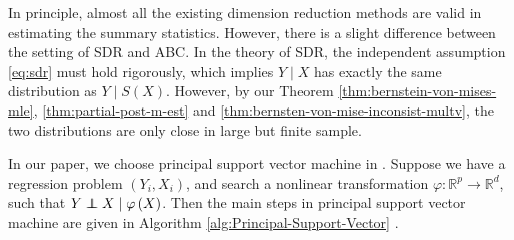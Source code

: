 \documentclass[oneside,english]{amsbook}
\numberwithin{section}{chapter}
\numberwithin{equation}{section}
\numberwithin{figure}{section}
\theoremstyle{plain}
\theoremstyle{plain}
\theoremstyle{definition}
\theoremstyle{plain}
\theoremstyle{plain}
\theoremstyle{remark}
\theoremstyle{definition}
\theoremstyle{definition}
\newcommand\independent{\protect\mathpalette{\protect\independenT}{\perp}}
\def\independenT#1#2{\mathrel{\rlap{$#1#2$}\mkern2mu{#1#2}}}
\begin{document}
In principle, almost all the existing dimension reduction methods
are valid in estimating the summary statistics. However, there is
a slight difference between the setting of SDR and ABC. In the theory
of SDR, the independent assumption \ref{eq:sdr} must hold rigorously,
which implies $Y\mid X$ has exactly the same distribution as $Y\mid S\left(X\right)$.
However, by our Theorem \ref{thm:bernstein-von-mises-mle}, \ref{thm:partial-post-m-est}
and \ref{thm:bernsten-von-mise-inconsist-multv}, the two distributions
are only close in large but finite sample. 

In our paper, we choose principal support vector machine in \citet{li2011principal}.
Suppose we have a regression problem $\left(Y_{i},X_{i}\right)$,
and search a nonlinear transformation $\varphi:\mathbb{R}^{p}\rightarrow\mathbb{R}^{d}$,
such that $Y\independent X\mid\varphi\left(X\right)$. Then the main
steps in principal support vector machine are given in Algorithm \ref{alg:Principal-Support-Vector}
. 
\end{document}
